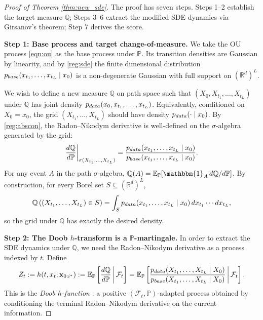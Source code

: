 \documentclass{article}
\newcommand{\pdata}{p_{\normalfont{data}}}
\newcommand{\pbase}{p_{\normalfont{base}}}
\newcommand{\PP}{\mathbb{P}}
\newcommand{\QQ}{\mathbb{Q}}
\newcommand{\EE}{\mathbb{E}}
\newcommand{\RR}{\mathbb{R}}
\newcommand{\FF}{\mathcal{F}}
\begin{document}
\begin{proof}[Proof of Theorem \ref{thm:new_sde}] The proof has seven steps. Steps 1--2 establish the target measure $\QQ$; Steps 3--6 extract the modified SDE dynamics via
Girsanov's theorem; Step 7 derives the score.

\noindent\textbf{Step 1: Base process and target change-of-measure.}
We take the OU process \eqref{eqn:ou} as the base process under $\PP$.  Its
transition densities are Gaussian by linearity, and by \ref{reg:sde} the finite dimensional
distribution $\pbase(x_{t_1},\ldots,x_{t_L}\mid x_0)$ is a non-degenerate Gaussian
with full support on $(\RR^d)^L$.

We wish to define a new measure $\QQ$ on path space such that $(X_0,X_{t_1},\ldots,X_{t_L})$
under $\QQ$ has joint density $\pdata(x_0,x_{t_1},\ldots,x_{t_L})$.
Equivalently, conditioned on $X_0=x_0$, the grid $(X_{t_1},\ldots,X_{t_L})$
should have density $\pdata(\cdot\mid x_0)$.  By
\ref{reg:abscon}, the Radon--Nikodym derivative is well-defined on the
$\sigma$-algebra generated by the grid:
\begin{equation}\label{eqn:rnd}
  \frac{d\QQ}{d\PP}\bigg|_{\sigma(X_{t_1},\ldots,X_{t_L})}
  = \frac{\pdata(x_{t_1},\ldots,x_{t_L}\mid x_0)}
         {\pbase(x_{t_1},\ldots,x_{t_L}\mid x_0)}.
\end{equation}
For any event $A$ in the path $\sigma$-algebra, $\QQ(A)=\EE_\PP[\mathbbm{1}_A\,d\QQ/d\PP]$.
By construction, for every Borel set $S\subseteq(\RR^d)^L$,
\[
  \QQ\left((X_{t_1},\ldots,X_{t_L})\in S\right)
  = \int_S \pdata(x_{t_1},\ldots,x_{t_L}\mid x_0)\,dx_{t_1}\cdots dx_{t_L},
\]
so the grid under $\QQ$ has exactly the desired density.

\noindent\textbf{Step 2: The Doob $h$-transform is a $\PP$-martingale.}
In order to extract the SDE dynamics under $\QQ$, we need the
Radon--Nikodym derivative \cite{radon1913theorie, nikodym1930generalisation} as a process indexed by $t$.  Define
\begin{equation}\label{eqn:Zt}
  Z_t
  := h(t,x_t;\mathbf{x}_{0:i^*})
  := \EE_\PP\left[
       \frac{d\QQ}{d\PP}\,\bigg|\,\FF_t
     \right]
   = \EE_\PP\left[
       \frac{\pdata(X_{t_1},\ldots,X_{t_L}\mid X_0)}
            {\pbase(X_{t_1},\ldots,X_{t_L}\mid X_0)}
       \,\bigg|\,\FF_t
     \right].
\end{equation}
This is the \emph{Doob $h$-function} \cite{doob1984classical}: a positive
$(\FF_t,\PP)$-adapted process obtained by conditioning the terminal
Radon--Nikodym derivative on the current information.


\end{proof}
\end{document}
